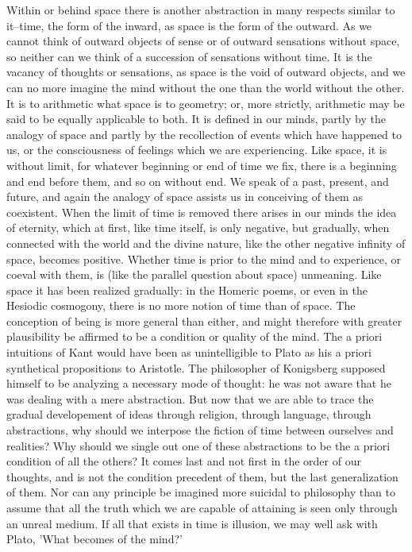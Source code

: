 Within or behind space there is another abstraction in many respects
similar to it--time, the form of the inward, as space is the form of the
outward. As we cannot think of outward objects of sense or of outward
sensations without space, so neither can we think of a succession of
sensations without time. It is the vacancy of thoughts or sensations,
as space is the void of outward objects, and we can no more imagine
the mind without the one than the world without the other. It is to
arithmetic what space is to geometry; or, more strictly, arithmetic may
be said to be equally applicable to both. It is defined in our minds,
partly by the analogy of space and partly by the recollection of events
which have happened to us, or the consciousness of feelings which we are
experiencing. Like space, it is without limit, for whatever beginning or
end of time we fix, there is a beginning and end before them, and so
on without end. We speak of a past, present, and future, and again the
analogy of space assists us in conceiving of them as coexistent. When
the limit of time is removed there arises in our minds the idea of
eternity, which at first, like time itself, is only negative, but
gradually, when connected with the world and the divine nature, like
the other negative infinity of space, becomes positive. Whether time is
prior to the mind and to experience, or coeval with them, is (like
the parallel question about space) unmeaning. Like space it has been
realized gradually: in the Homeric poems, or even in the Hesiodic
cosmogony, there is no more notion of time than of space. The conception
of being is more general than either, and might therefore with greater
plausibility be affirmed to be a condition or quality of the mind. The a
priori intuitions of Kant would have been as unintelligible to Plato as
his a priori synthetical propositions to Aristotle. The philosopher of
Konigsberg supposed himself to be analyzing a necessary mode of thought:
he was not aware that he was dealing with a mere abstraction. But now
that we are able to trace the gradual developement of ideas through
religion, through language, through abstractions, why should we
interpose the fiction of time between ourselves and realities? Why
should we single out one of these abstractions to be the a priori
condition of all the others? It comes last and not first in the order of
our thoughts, and is not the condition precedent of them, but the last
generalization of them. Nor can any principle be imagined more suicidal
to philosophy than to assume that all the truth which we are capable of
attaining is seen only through an unreal medium. If all that exists
in time is illusion, we may well ask with Plato, 'What becomes of the
mind?'

